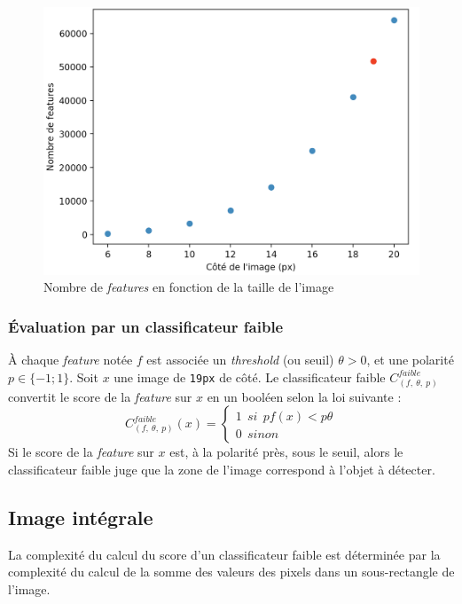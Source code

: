 \documentclass[12pt,a4paper]{article}
\begin{document}
\begin{figure}[t]
    \includegraphics[scale = 0.4]{nombre_features_cut}
    \centering
    \caption{Nombre de \textit{features} en fonction de la taille de l'image}
\end{figure}

\subsubsection{Évaluation par un classificateur faible}
À chaque \textit{feature} notée $f$ est associée un \textit{threshold} (ou seuil) $\theta > 0$, et une polarité $p \in \{-1 ; 1\}$. Soit $x$ une image de \texttt{19px} de côté. Le classificateur faible $C_{(f, \: \theta, \: p)}^{faible}$ convertit le score de la \textit{feature} sur $x$ en un booléen selon la loi suivante :
$$C_{(f, \: \theta, \: p)}^{faible}(x) = 
\begin{cases}
1 \:\: si \:\: pf(x) < p\theta \\
0 \:\: sinon
\end{cases}$$
Si le score de la \textit{feature} sur $x$ est, à la polarité près, sous le seuil, alors le classificateur faible juge que la zone de l'image correspond à l'objet à détecter.

\subsection{Image intégrale}
La complexité du calcul du score d'un classificateur faible est déterminée par la complexité du calcul de la somme des valeurs des pixels dans un sous-rectangle de l'image.
\end{document}
